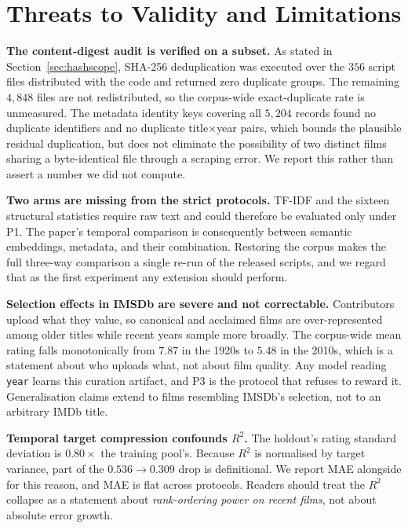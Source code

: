 \documentclass[conference,a4paper]{IEEEtran}
\newcommand{\hlt}[1]{\textbf{#1}}
\begin{document}
\section{Threats to Validity and Limitations}
\label{sec:limits}

\hlt{The content-digest audit is verified on a subset.} As stated in
Section~\ref{sec:hashscope}, SHA-256 deduplication was executed over the
$356$ script files distributed with the code and returned zero duplicate
groups. The remaining $4{,}848$ files are not redistributed, so the
corpus-wide exact-duplicate rate is unmeasured. The metadata identity
keys covering all $5{,}204$ records found no duplicate identifiers and no
duplicate title$\times$year pairs, which bounds the plausible residual
duplication, but does not eliminate the possibility of two distinct
films sharing a byte-identical file through a scraping error. We report
this rather than assert a number we did not compute.

\hlt{Two arms are missing from the strict protocols.} TF-IDF and the
sixteen structural statistics require raw text and could therefore be
evaluated only under P1. The paper's temporal comparison is consequently
between semantic embeddings, metadata, and their combination. Restoring
the corpus makes the full three-way comparison a single re-run of the
released scripts, and we regard that as the first experiment any
extension should perform.

\hlt{Selection effects in IMSDb are severe and not correctable.}
Contributors upload what they value, so canonical and acclaimed films are
over-represented among older titles while recent years sample more
broadly. The corpus-wide mean rating falls monotonically from $7.87$ in
the 1920s to $5.48$ in the 2010s, which is a statement about who uploads
what, not about film quality. Any model reading \texttt{year} learns this
curation artifact, and P3 is the protocol that refuses to reward it.
Generalisation claims extend to films resembling IMSDb's selection, not
to an arbitrary IMDb title.

\hlt{Temporal target compression confounds $R^{2}$.} The holdout's
rating standard deviation is $0.80\times$ the training pool's. Because
$R^{2}$ is normalised by target variance, part of the $0.536 \to 0.309$
drop is definitional. We report MAE alongside for this reason, and MAE is
flat across protocols. Readers should treat the $R^{2}$ collapse as a
statement about \emph{rank-ordering power on recent films}, not about
absolute error growth.
\end{document}
